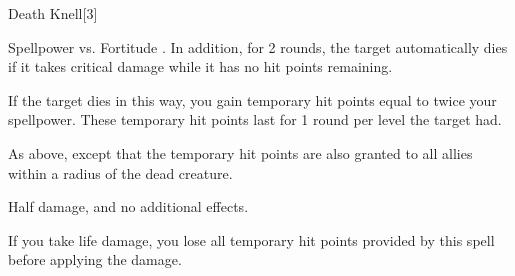 \begin{spellsection}{Death Knell}[3]
    \begin{spellheader}
    \end{spellheader}
    \begin{spellcontent}
        \begin{spelltargetinginfo}
        \end{spelltargetinginfo}
        \begin{spelleffects}
            \begin{spellattack}{Spellpower vs. Fortitude}
                \spellsuccess {}. In addition, for 2 rounds, the target automatically dies if it takes critical damage while it has no hit points remaining.

                If the target dies in this way, you gain temporary hit points equal to twice your spellpower. These temporary hit points last for 1 round per level the target had.

                \spellcritical As above, except that the temporary hit points are also granted to all allies within a \arealarge radius of the dead creature.

                \spellfailure Half damage, and no additional effects.
            \end{spellattack}
        \end{spelleffects}
    \end{spellcontent}
    \begin{spellfooter}
        \spellnotes If you take life damage, you lose all temporary hit points provided by this spell before applying the damage.
        \miscastrandom
    \end{spellfooter}
\end{spellsection}


